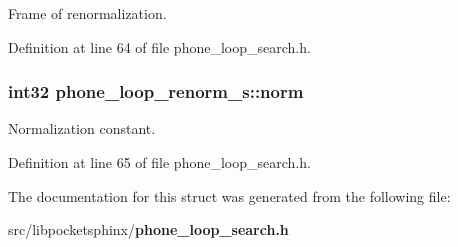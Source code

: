 Frame of renormalization. 



Definition at line 64 of file phone\+\_\+loop\+\_\+search.\+h.

\subsubsection[{norm}]{\setlength{\rightskip}{0pt plus 5cm}int32 phone\+\_\+loop\+\_\+renorm\+\_\+s\+::norm}\label{structphone__loop__renorm__s_a9a76415892efce2e4b53bc5ea6599010}


Normalization constant. 



Definition at line 65 of file phone\+\_\+loop\+\_\+search.\+h.



The documentation for this struct was generated from the following file\+:\begin{DoxyCompactItemize}
\item 
src/libpocketsphinx/{\bf phone\+\_\+loop\+\_\+search.\+h}\end{DoxyCompactItemize}
